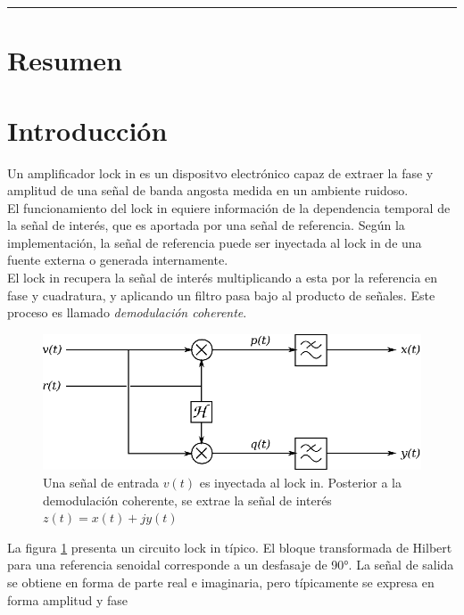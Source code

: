 \documentclass[11pt,a4paper]{extarticle}
\begin{document}
\hrule
\begin{multicols}{2}
\normalsize
\section{Resumen}

\section{Introducción}

Un amplificador lock in es un dispositvo electrónico capaz de extraer la fase y amplitud de una señal de banda angosta medida en un ambiente ruidoso.\\

El funcionamiento del lock in equiere información de la dependencia temporal de la señal de interés, que es aportada por una señal de referencia. Según la implementación, la señal de referencia puede ser inyectada al lock in de una fuente externa o generada internamente.\\ 

El lock in recupera la señal de interés multiplicando a esta por la referencia en fase y cuadratura, y aplicando un filtro pasa bajo al producto de señales. Este proceso es llamado \textit{demodulación coherente}.\\

\begin{figure}[H]
	\centering
	\includegraphics[width=\linewidth]{Images/lockin_gral.eps}
	\caption{Una señal de entrada $v(t)$ es inyectada al lock in. Posterior a la demodulación coherente, se extrae la señal de interés $z(t)=x(t)+jy(t)$}
	\label{fig:lockin}
\end{figure}

La figura \ref{fig:lockin} presenta un circuito lock in típico. El bloque transformada de Hilbert para una referencia senoidal corresponde a un desfasaje de 90°. La señal de salida se obtiene en forma de parte real e imaginaria, pero típicamente se expresa en forma amplitud y fase


\end{multicols}
\end{document}
